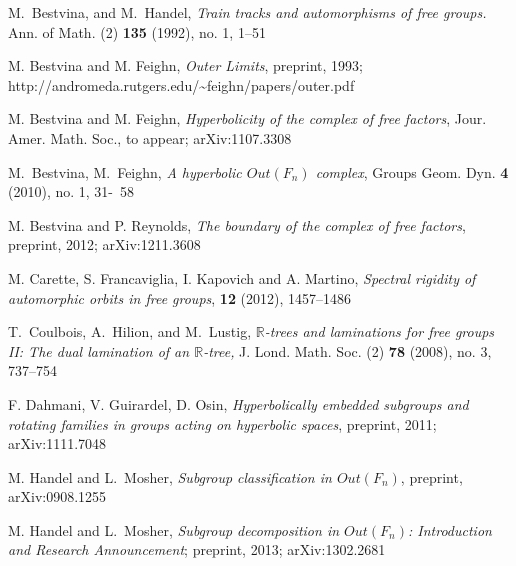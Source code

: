 \documentclass[10pt]{amsart}
\newcommand\<{\langle}
\renewcommand\>{\rangle}
\theoremstyle{definition}
\begin{document}
\begin{thebibliography}{ABC}




 M.~Bestvina, and M.~Handel, \emph{Train tracks and
automorphisms of free groups.} Ann.  of Math.  (2) \textbf{135}
(1992), no.  1, 1--51


 M. Bestvina and M. Feighn, \emph{Outer Limits},
preprint, 1993; \\ http://andromeda.rutgers.edu/\~{}feighn/papers/outer.pdf


M. Bestvina and M. Feighn, \emph{Hyperbolicity of the complex of free factors}, Jour. Amer. Math. Soc., to appear;  arXiv:1107.3308




M.~Bestvina, M.~Feighn, \emph{A hyperbolic $Out(F_n)$ complex},  Groups Geom. Dyn.  \textbf{4}  (2010),  no. 1, 31-~58


M. Bestvina and P. Reynolds,
\emph{The boundary of the complex of free factors}, 
preprint, 2012; arXiv:1211.3608



M. Carette, S. Francaviglia, I. Kapovich and A. Martino,
\emph{Spectral rigidity of automorphic orbits in free groups}, \textbf{12} (2012), 1457--1486



 T.~Coulbois, A.~Hilion, and M.~Lustig, \emph{ $\mathbb R$-trees and
 laminations for free groups II: The dual lamination of an $\mathbb
 R$-tree,} J. Lond. Math. Soc. (2)  \textbf{78}  (2008),  no. 3,
737--754


F. Dahmani, V. Guirardel, D. Osin,
\emph{Hyperbolically embedded subgroups and rotating families in groups acting on hyperbolic spaces}, preprint, 2011; arXiv:1111.7048





M. Handel and L.~Mosher,
\emph{Subgroup classification in $Out (F_n)$}, preprint,
arXiv:0908.1255


M. Handel and L.~Mosher,
\emph{Subgroup decomposition in $Out(F_n)$: Introduction and Research
Announcement}; preprint, 2013; arXiv:1302.2681




\end{thebibliography}
\end{document}
